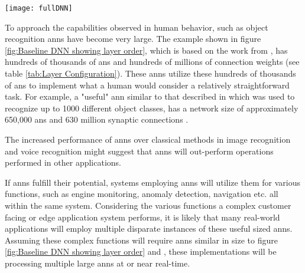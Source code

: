 \begin{sidewaysfigure}[h]
    \bigskip

      \begin{minipage}{1\textwidth}
        \centering
        \texttt{[image: fullDNN]}
        \captionsetup{justification=centering, skip=15pt}
        \label{fig:Baseline DNN showing layer order}
      \end{minipage}
  
\end{sidewaysfigure}



\iffalse
\begin{sidewaysfigure}[h]
\centering
\texttt{[image: fullDNN]}
\captionsetup{justification=centering, skip=15pt}
\caption{DNN showing layer order \cite{krizhevsky2012imagenet}}
\label{fig:DNN showing layer order}
\end{sidewaysfigure}
\fi

To approach the capabilities observed in human behavior, such as object recognition \ac{ann}s have become very large. The example shown in figure \ref{fig:Baseline DNN showing layer order}, which is based on the work from \cite{krizhevsky2012imagenet}, has hundreds of thousands of \acp{an} and hundreds of millions of connection weights (see table \ref{tab:Layer Configuration}).
These \acp{ann} utilize these hundreds of thousands of \acp{an} to implement what a human would consider a relatively straightforward task.
For example, a "useful" \ac{ann} similar to that described in \cite{krizhevsky2012imagenet} which was used to recognize up to 1000 different object classes, has a network size of approximately 650,000 \acp{an} and 630 million synaptic connections \cite{krizhevsky2012imagenetPreso}. 

The increased performance of \ac{ann}s over classical methods in image recognition and voice recognition might suggest that \ac{ann}s will out-perform operations performed in other applications.
\iffalse There is reason to believe that \acp{ann} will replace various functions in existing systems. \fi

If \ac{ann}s fulfill their potential, systems employing \ac{ann}s will utilize them for various functions, such as engine monitoring, anomaly detection, navigation etc. all within the same system.
Considering the various functions a complex customer facing or edge application system performs, it is likely that many real-world applications will employ multiple disparate instances of these useful sized \ac{ann}s.
Assuming these complex functions will require \ac{ann}s similar in size to figure \ref{fig:Baseline DNN showing layer order} and \cite{krizhevsky2012imagenet}, these implementations will be processing multiple large \ac{ann}s at or near real-time.

